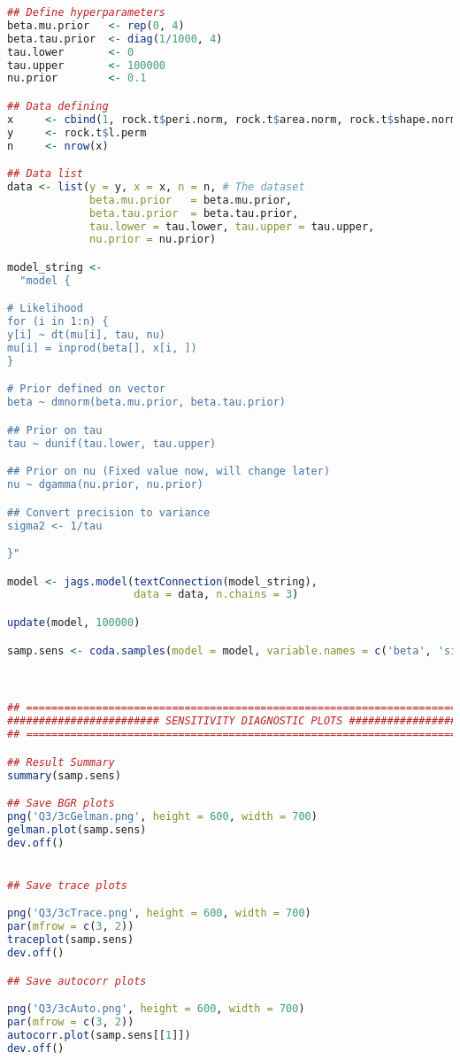 \documentclass{article}
\begin{document}
\begin{lstlisting}[language=R]
## Define hyperparameters
beta.mu.prior   <- rep(0, 4)
beta.tau.prior  <- diag(1/1000, 4)
tau.lower       <- 0
tau.upper       <- 100000
nu.prior        <- 0.1

## Data defining
x     <- cbind(1, rock.t$peri.norm, rock.t$area.norm, rock.t$shape.norm)
y     <- rock.t$l.perm
n     <- nrow(x)

## Data list
data <- list(y = y, x = x, n = n, # The dataset 
             beta.mu.prior   = beta.mu.prior, 
             beta.tau.prior  = beta.tau.prior,
             tau.lower = tau.lower, tau.upper = tau.upper, 
             nu.prior = nu.prior)

model_string <-   
  "model {

# Likelihood
for (i in 1:n) {
y[i] ~ dt(mu[i], tau, nu)
mu[i] = inprod(beta[], x[i, ])
}

# Prior defined on vector
beta ~ dmnorm(beta.mu.prior, beta.tau.prior)

## Prior on tau
tau ~ dunif(tau.lower, tau.upper)

## Prior on nu (Fixed value now, will change later)
nu ~ dgamma(nu.prior, nu.prior)

## Convert precision to variance
sigma2 <- 1/tau

}"

model <- jags.model(textConnection(model_string), 
                    data = data, n.chains = 3)

update(model, 100000)

samp.sens <- coda.samples(model = model, variable.names = c('beta', 'sigma2', 'nu'), n.iter = 250000, thin = 50)



## ===========================================================================##
######################## SENSITIVITY DIAGNOSTIC PLOTS ##########################
## ===========================================================================##

## Result Summary
summary(samp.sens)

## Save BGR plots
png('Q3/3cGelman.png', height = 600, width = 700)
gelman.plot(samp.sens)
dev.off()


## Save trace plots

png('Q3/3cTrace.png', height = 600, width = 700)
par(mfrow = c(3, 2))
traceplot(samp.sens)
dev.off()

## Save autocorr plots

png('Q3/3cAuto.png', height = 600, width = 700)
par(mfrow = c(3, 2))
autocorr.plot(samp.sens[[1]])
dev.off()


\end{lstlisting}
\end{document}
